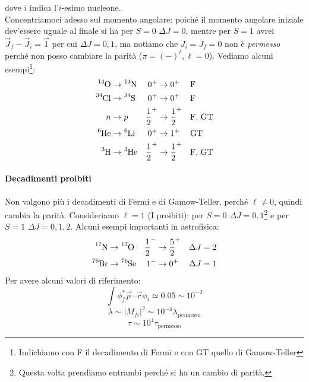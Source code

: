 dove $i$ indica l'$i$-esimo nucleone. \\
Concentriamoci adesso sul momento angolare: poiché il momento angolare iniziale dev'essere uguale al finale si ha per $S=0$ $\Delta J = 0$, mentre per $S=1$ avrei $\vec{J}_f - \vec{J}_i = \vec{1} $ per cui $\Delta J = 0,1$, ma notiamo che $J_i=J_f=0$ non è \textit{permesso} perché non posso cambiare la parità ($\pi = (-)^\ell, \ell=0$). Vediamo alcuni esempi\footnote{Indichiamo con F il decadimento di Fermi e con GT quello di Gamow-Teller}:
\begin{displaymath}
\begin{aligned}
\ce{^{14}O} &\to \ce{^{14}N} & 0^+&\to0^+ & &\text{F} \\
\ce{^{34}Cl} &\to \ce{^{34}S} & 0^+&\to0^+ & &\text{F} \\
n &\to p & \frac{1}{2}^+&\to\frac{1}{2}^+ & &\text{F, GT} \\
\ce{^{6}He} &\to \ce{^{6}Li} & 0^+&\to1^+ & &\text{GT} \\
\ce{^{3}H} &\to \ce{^{3}He} & \frac{1}{2}^+&\to\frac{1}{2}^+ & &\text{F, GT} 
\end{aligned}
\end{displaymath}

\paragraph{Decadimenti proibiti} Non valgono più i decadimenti di Fermi e di Gamow-Teller, perché $\ell\not =0 $, quindi cambia la parità. Consideriamo $\ell=1$ (I proibiti): per $S=0$ $\Delta J = 0,1$\footnote{Questa volta prendiamo entrambi perché si ha un cambio di parità.} e per $S=1$ $\Delta J = 0,1,2$. Alcuni esempi importanti in astrofisica:
\begin{displaymath}
\begin{aligned}
\ce{^{17}N}&\to \ce{^{17}O} & \frac{1}{2}^- &\to \frac{5}{2}^+ & \Delta J = 2 \\
\ce{^{76}Br}&\to \ce{^{76}Se} & 1^- &\to 0^+ & \Delta J = 1
\end{aligned}
\end{displaymath}
Per avere alcuni valori di riferimento:
$$\int \phi_f^* \vec{p}\cdot \vec{r} \phi_i \simeq 0.05 \sim 10^{-2}  $$
$$\lambda \sim |M_{fi}|^2\sim 10^{-4} \lambda_\text{permesso}$$
$$\tau \sim 10^4 \tau_\text{permesso}$$
